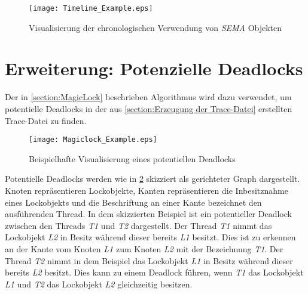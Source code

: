 \begin{figure}[ht]
  \texttt{[image: Timeline\_Example.eps]}
  \caption{Visualisierung der chronologischen Verwendung von \textit{SEMA} Objekten}
  \label{fig:Timeline_Example}
\end{figure}

\section{Erweiterung: Potenzielle Deadlocks}
\label{section:Erweiterung: Potenzielle Deadlocks}
Der in \cref{section:MagicLock} beschrieben Algorithmus wird dazu verwendet, um
potentielle Deadlocks in der aus \cref{section:Erzeugung der Trace-Datei}
erstellten Trace-Datei zu finden. 

\begin{figure}[ht]
  \texttt{[image: Magiclock\_Example.eps]}
  \caption{Beispielhafte Visualisierung eines potentiellen Deadlocks}
  \label{fig:Magiclock_Example}
\end{figure}

Potentielle Deadlocks werden wie in \cref{fig:Magiclock_Example} skizziert als
gerichteter Graph dargestellt. Knoten repräsentieren Lockobjekte, Kanten
repräsentieren die Inbesitznahme eines Lockobjekts und die Beschriftung an einer
Kante bezeichnet den ausführenden Thread. In dem skizzierten Beispiel ist ein
potentieller Deadlock zwischen den Threads \textit{T1} und \textit{T2}
dargestellt. Der Thread \textit{T1} nimmt das Lockobjekt \textit{L2} in Besitz
während dieser bereits \textit{L1} besitzt. Dies ist zu erkennen an der Kante
vom Knoten \textit{L1} zum Knoten \textit{L2} mit der Bezeichnung \textit{T1}.
Der Thread \textit{T2} nimmt in dem Beispiel das Lockobjekt \textit{L1} in
Besitz während dieser bereits \textit{L2} besitzt. Dies kann zu einem Deadlock
führen, wenn \textit{T1} das Lockobjekt \textit{L1} und \textit{T2} das
Lockobjekt \textit{L2} gleichzeitig besitzen.